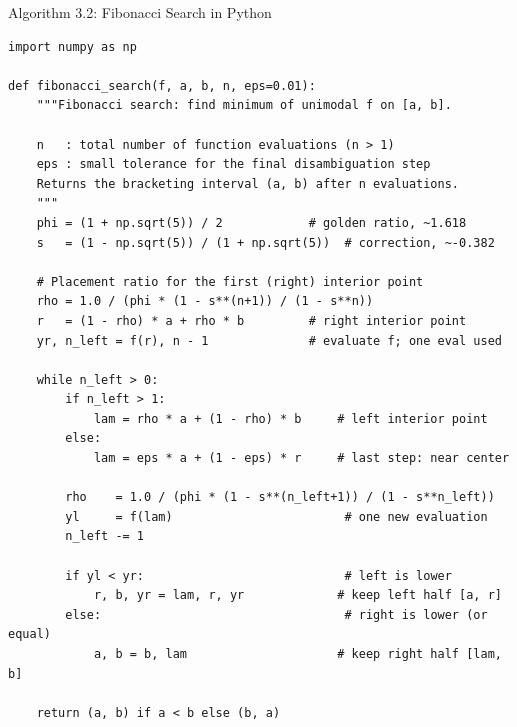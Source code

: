 \documentclass[aspectratio=169,10pt]{beamer}
\begin{document}
\begin{frame}[fragile]{Algorithm 3.2: Fibonacci Search in Python}
\begin{lstlisting}[style=pycode, caption={Python: Fibonacci search for unimodal f on [a,b] with n evaluations}]
import numpy as np

def fibonacci_search(f, a, b, n, eps=0.01):
    """Fibonacci search: find minimum of unimodal f on [a, b].

    n   : total number of function evaluations (n > 1)
    eps : small tolerance for the final disambiguation step
    Returns the bracketing interval (a, b) after n evaluations.
    """
    phi = (1 + np.sqrt(5)) / 2            # golden ratio, ~1.618
    s   = (1 - np.sqrt(5)) / (1 + np.sqrt(5))  # correction, ~-0.382

    # Placement ratio for the first (right) interior point
    rho = 1.0 / (phi * (1 - s**(n+1)) / (1 - s**n))
    r   = (1 - rho) * a + rho * b         # right interior point
    yr, n_left = f(r), n - 1              # evaluate f; one eval used

    while n_left > 0:
        if n_left > 1:
            lam = rho * a + (1 - rho) * b     # left interior point
        else:
            lam = eps * a + (1 - eps) * r     # last step: near center

        rho    = 1.0 / (phi * (1 - s**(n_left+1)) / (1 - s**n_left))
        yl     = f(lam)                        # one new evaluation
        n_left -= 1

        if yl < yr:                            # left is lower
            r, b, yr = lam, r, yr             # keep left half [a, r]
        else:                                  # right is lower (or equal)
            a, b = b, lam                     # keep right half [lam, b]

    return (a, b) if a < b else (b, a)
\end{lstlisting}
\end{frame}
\end{document}
